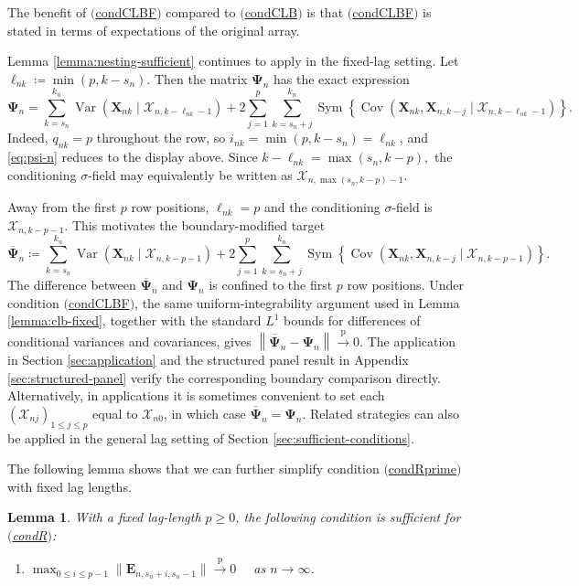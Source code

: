 \documentclass[11pt]{article}
\renewcommand\vec[1]{\boldsymbol{#1}}
\newcommand\mat[1]{\mathbf{#1}}
\DeclareMathOperator{\Cov}{Cov}
\DeclareMathOperator{\Var}{Var}
\DeclareMathOperator{\Sym}{Sym}
\newcommand{\X}{\mathcal{X}}
\newcommand{\labeleditem}[1]{%
  \item[$\mathrm{(}$\csname cond#1\endcsname$\mathrm{)}$]%
  \hypertarget{cond:#1}{}%
}
\newcommand{\refitem}[1]{$\mathrm{(}$\hyperlink{cond:#1}{\csname cond#1\endcsname}$\mathrm{)}$}
\newcommand{\pconverge}{\overset{\mathrm{p}}{\to}}
\newtheorem{lemma}{Lemma}
\theoremstyle{definition}
\begin{document}
The benefit of \refitem{CLBF} compared to \refitem{CLB} is that \refitem{CLBF} is stated in terms of expectations of the original array.

Lemma \ref{lemma:nesting-sufficient} continues to apply in the
fixed-lag setting. Let
$
\ell_{nk}\coloneqq\min(p,k-s_n).
$
Then the matrix \(\mat{\Psi}_n\) has the exact expression
\[
\mat{\Psi}_n
={}
\sum_{k=s_n}^{k_n}
\Var\!\left(
\vec X_{nk}\mid\X_{n,k-\ell_{nk}-1}
\right)
+
2\sum_{j=1}^{p}\sum_{k=s_n+j}^{k_n}
\Sym\!\left\{
\Cov\!\left(
\vec X_{nk},\vec X_{n,k-j}
\mid\X_{n,k-\ell_{nk}-1}
\right)
\right\}.
\]
Indeed, \(q_{nk} = p\) throughout the row, so \(i_{nk} = \min(p, k - s_n) = \ell_{nk}\), and \eqref{eq:psi-n} reduces to the display above.
Since
$
k-\ell_{nk}=\max(s_n,k-p),
$
the conditioning $\sigma$-field may equivalently be written as
\(\X_{n,\max(s_n,k-p)-1}\).

Away from the first \(p\) row positions, \(\ell_{nk}=p\) and the conditioning $\sigma$-field is \(\X_{n,k-p-1}\). This motivates the
boundary-modified target
\[
\overline{\mat{\Psi}}_n
\coloneqq{}
\sum_{k=s_n}^{k_n}
\Var\!\left(
\vec X_{nk}\mid\X_{n,k-p-1}
\right)
+
2\sum_{j=1}^{p}\sum_{k=s_n+j}^{k_n}
\Sym\!\left\{
\Cov\!\left(
\vec X_{nk},\vec X_{n,k-j}
\mid\X_{n,k-p-1}
\right)
\right\}.
\]
The difference between \(\overline{\mat{\Psi}}_n\) and
\(\mat{\Psi}_n\) is confined to the first \(p\) row positions.
Under condition \refitem{CLBF}, the same uniform-integrability
argument used in Lemma \ref{lemma:clb-fixed}, together with the
standard \(L^1\) bounds for differences of conditional variances and
covariances, gives
$
\left\|
\overline{\mat{\Psi}}_n-\mat{\Psi}_n
\right\|\pconverge0.
$
The application in Section \ref{sec:application} and the structured
panel result in Appendix \ref{sec:structured-panel} verify the
corresponding boundary comparison directly.
Alternatively, in applications it is sometimes convenient to set each $(\X_{nj})_{1 \leq j \leq p}$ equal to $\X_{n0}$, in which case $\overline{\mat{\Psi}}_n = \mat{\Psi}_n$.
Related strategies can also be applied in the general lag setting of Section \ref{sec:sufficient-conditions}.

The following lemma shows that we can further simplify condition \refitem{Rprime} with fixed lag lengths.

\begin{lemma}\label{lemma:remainder-fixed}
With a fixed lag-length $p \geq 0$, the following condition is sufficient for \refitem{R}:
\begin{enumerate}
    \labeleditem{RF} $\max_{0 \leq i \leq p-1} \|\vec{E}_{n,s_n+i,s_n-1}\| \pconverge 0 \quad$ as $n \to \infty$.
\end{enumerate}  
\end{lemma}
\end{document}
